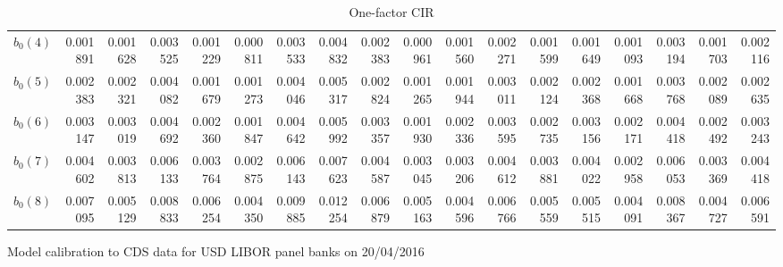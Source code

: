 \documentclass[12pt,a4paper]{article}
\theoremstyle{plain}
\numberwithin{equation}{section}
\begin{document}
\begin{table}[t]
\begin{subtable}{.5\textwidth}
{\begin{tabular}{|l|rrrrrrrrrrrrrrrr|r|}
    $\hat{b}_0(4)$   & 0.001891 & 0.001628 & 0.003525 & 0.001229 & 0.000811 & 0.003533 & 0.004832 & 0.002383 & 0.000961 & 0.001560 & 0.002271 & 0.001599 & 0.001649 & 0.001093 & 0.003194 & 0.001703 & 0.002116 \\
    $\hat{b}_0(5)$   & 0.002383 & 0.002321 & 0.004082 & 0.001679 & 0.001273 & 0.004046 & 0.005317 & 0.002824 & 0.001265 & 0.001944 & 0.003011 & 0.002124 & 0.002368 & 0.001668 & 0.003768 & 0.002089 & 0.002635 \\
    $\hat{b}_0(6)$   & 0.003147 & 0.003019 & 0.004692 & 0.002360 & 0.001847 & 0.004642 & 0.005992 & 0.003357 & 0.001930 & 0.002336 & 0.003595 & 0.002735 & 0.003156 & 0.002171 & 0.004418 & 0.002492 & 0.003243 \\
    $\hat{b}_0(7)$   & 0.004602 & 0.003813 & 0.006133 & 0.003764 & 0.002875 & 0.006143 & 0.007623 & 0.004587 & 0.003045 & 0.003206 & 0.004612 & 0.003881 & 0.004022 & 0.002958 & 0.006053 & 0.003369 & 0.004418 \\
    $\hat{b}_0(8)$   & 0.007095 & 0.005129 & 0.008833 & 0.006254 & 0.004350 & 0.009885 & 0.012254 & 0.006879 & 0.005163 & 0.004596 & 0.006766 & 0.005559 & 0.005515 & 0.004091 & 0.008367 & 0.004727 & 0.006591 \\

    \bottomrule
    \end{tabular}%
    }
  \end{subtable}
 \caption{Model calibration to CDS data for USD LIBOR panel banks on 20/04/2016}\label{CDScoeff1}\vspace*{1ex}

  \begin{subtable}{.5\textwidth}
  \centering
  \caption{One-factor CIR}
  \scalebox{0.40}{

}
\end{subtable}
\end{table}
\end{document}
